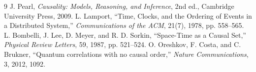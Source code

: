 \documentclass[11pt]{article}
\begin{document}
\begin{thebibliography}{9}
 J. Pearl, \emph{Causality: Models, Reasoning, and Inference}, 2nd ed., Cambridge University Press, 2009.
 L. Lamport, ``Time, Clocks, and the Ordering of Events in a Distributed System,'' \emph{Communications of the ACM}, 21(7), 1978, pp. 558--565.
 L. Bombelli, J. Lee, D. Meyer, and R. D. Sorkin, ``Space-Time as a Causal Set,'' \emph{Physical Review Letters}, 59, 1987, pp. 521--524.
 O. Oreshkov, F. Costa, and C. Brukner, ``Quantum correlations with no causal order,'' \emph{Nature Communications}, 3, 2012, 1092.
\end{thebibliography}
\end{document}
